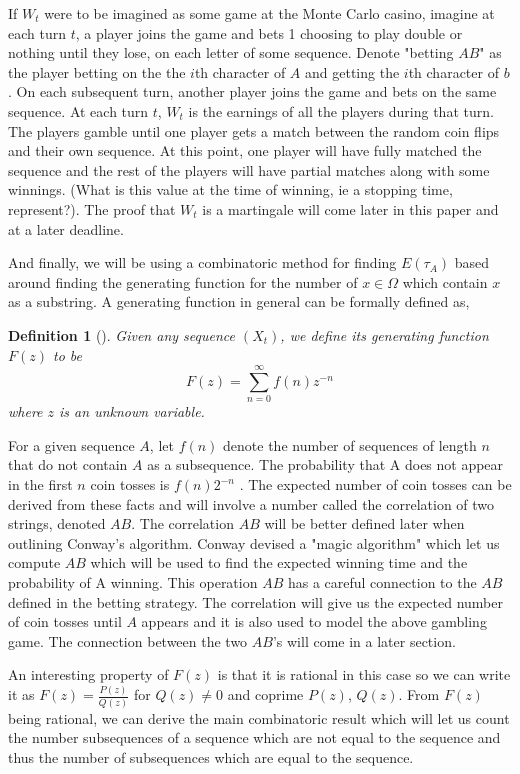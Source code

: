 \documentclass{article}
\newtheorem{definition}[theorem]{Definition}
\numberwithin{mytheorem}{subsection} %
\begin{document}
	    If $W_t$ were to be imagined as some game at the Monte Carlo casino, imagine at each turn $t$, a player joins the game and bets 1 choosing to play double or nothing until they lose, on each letter of some sequence. Denote "betting $AB$" as the player betting on the the $i$th character of $A$ and getting the $i$th character of $b$. On each subsequent turn, another player joins the game and bets on the same sequence. At each turn $t$, $W_t$ is the earnings of all the players during that turn. The players gamble until one player gets a match between the random coin flips and their own sequence. At this point, one player will have fully matched the sequence and the rest of the players will have partial matches along with some winnings. (What is this value at the time of winning, ie a stopping time, represent?). The proof that $W_t$ is a martingale will come later in this paper and at a later deadline. 

		And finally, we will be using a combinatoric method for finding $E(\tau_A)$ based around finding the generating function for the number of $x \in \Omega$ which contain $x$ as a substring. A generating function in general can be formally defined as,
		\begin{definition}[\cite{enumerate}]
			Given any sequence $(X_t)$, we define its generating function $F(z)$ to be
			$$F(z) = \sum_{n=0}^\infty f(n) z^{-n}$$
			where $z$ is an unknown variable.
		\end{definition}

		For a given sequence $A$, let $f(n)$ denote the number of sequences of length $n$ that do not contain $A$ as a subsequence. The probability that A does not appear in the first $n$ coin tosses is $f(n)2^{-n}$ \cite{enumerate}. The expected number of coin tosses can be derived from these facts and will involve a number called the correlation of two strings, denoted $AB$. The correlation $AB$ will be better defined later when outlining Conway's algorithm. Conway devised a "magic algorithm" which let us compute $AB$ which will be used to find the expected winning time and the probability of A winning. This operation $AB$ has a careful connection to the $AB$ defined in the betting strategy. The correlation will give us the expected number of coin tosses until $A$ appears and it is also used to model the above gambling game. The connection between the two $AB$'s will come in a later section.

		An interesting property of $F(z)$ is that it is rational in this case so we can write it as $F(z) = \frac{P(z)}{Q(z)}$ for $Q(z) \neq 0$ and coprime $P(z)$, $Q(z)$. From $F(z)$ being rational, we can derive the main combinatoric result which will let us count the number subsequences of a sequence which are not equal to the sequence and thus the number of subsequences which are equal to the sequence.
\end{document}
